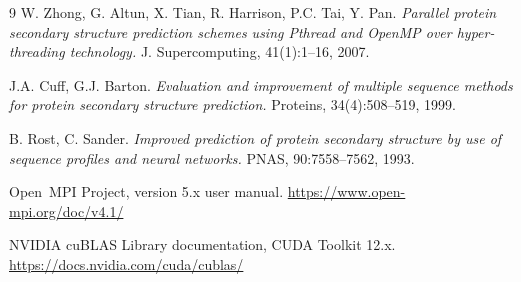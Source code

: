 \documentclass[11pt,a4paper]{article}
\begin{document}
\newpage
\begin{thebibliography}{9}
 W. Zhong, G. Altun, X. Tian, R. Harrison, P.C. Tai,
Y. Pan. \emph{Parallel protein secondary structure prediction schemes
using Pthread and OpenMP over hyper-threading technology.}
J. Supercomputing, 41(1):1--16, 2007.

 J.A. Cuff, G.J. Barton. \emph{Evaluation and
improvement of multiple sequence methods for protein secondary structure
prediction.} Proteins, 34(4):508--519, 1999.

 B. Rost, C. Sander. \emph{Improved prediction of
protein secondary structure by use of sequence profiles and neural
networks.} PNAS, 90:7558--7562, 1993.

 Open~MPI Project, version 5.x user manual.
\url{https://www.open-mpi.org/doc/v4.1/}

 NVIDIA cuBLAS Library documentation, CUDA Toolkit 12.x.
\url{https://docs.nvidia.com/cuda/cublas/}
\end{thebibliography}
\end{document}
